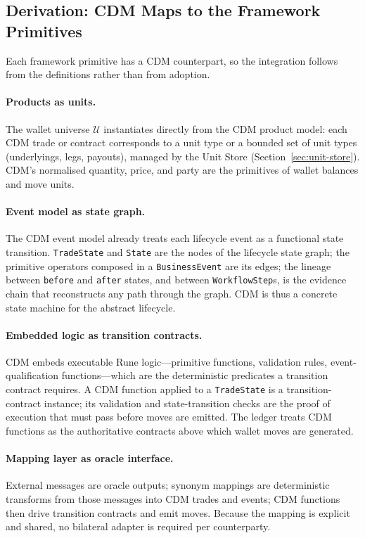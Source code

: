 \subsection{Derivation: CDM Maps to the Framework Primitives}

Each framework primitive has a CDM counterpart, so the integration follows from the definitions rather than from adoption.

\paragraph{Products as units.} The wallet universe $\mathcal{U}$ instantiates directly from the CDM product model: each CDM trade or contract corresponds to a unit type or a bounded set of unit types (underlyings, legs, payouts), managed by the Unit Store (Section~\ref{sec:unit-store}). CDM's normalised quantity, price, and party are the primitives of wallet balances and move units.

\paragraph{Event model as state graph.} The CDM event model already treats each lifecycle event as a functional state transition. \texttt{TradeState} and \texttt{State} are the nodes of the lifecycle state graph; the primitive operators composed in a \texttt{BusinessEvent} are its edges; the lineage between \texttt{before} and \texttt{after} states, and between \texttt{WorkflowStep}s, is the evidence chain that reconstructs any path through the graph. CDM is thus a concrete state machine for the abstract lifecycle.

\paragraph{Embedded logic as transition contracts.} CDM embeds executable Rune logic---primitive functions, validation rules, event-qualification functions---which are the deterministic predicates a transition contract requires. A CDM function applied to a \texttt{TradeState} is a transition-contract instance; its validation and state-transition checks are the proof of execution that must pass before moves are emitted. The ledger treats CDM functions as the authoritative contracts above which wallet moves are generated.

\paragraph{Mapping layer as oracle interface.} External messages are oracle outputs; synonym mappings are deterministic transforms from those messages into CDM trades and events; CDM functions then drive transition contracts and emit moves. Because the mapping is explicit and shared, no bilateral adapter is required per counterparty.

